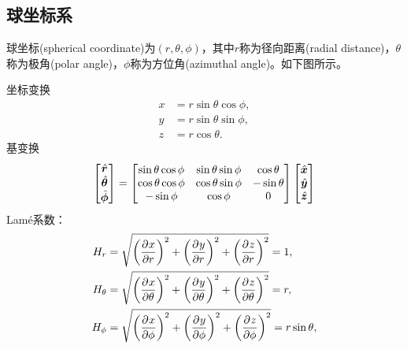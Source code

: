 \subsection{球坐标系}
\label{ssec:spherical coordinate}

球坐标(spherical coordinate)为$(r,\theta,\phi)$，其中$r$称为径向距离(radial distance)，$\theta$称为极角(polar angle)，$\phi$称为方位角(azimuthal angle)。如下图所示。
\begin{notecaptionblock}
    \label{fig:spherical coordinate}
\end{notecaptionblock}
坐标变换
\begin{subequations}
    \begin{align}
        x &= r\sin\theta\cos\phi,\\
        y &= r\sin\theta\sin\phi,\\
        z &= r\cos\theta.
    \end{align}
\end{subequations}
基变换
\begin{equation}
    \begin{bmatrix}
        \mathop{}\!\hat{\bm{r}}\\\mathop{}\!\hat{\bm{\theta}}\\\mathop{}\!\hat{\bm{\phi}}
    \end{bmatrix} =
    \begin{bmatrix}
        \sin\theta\cos\phi&\sin\theta\sin\phi&\cos\theta\\
        \cos\theta\cos\phi&\cos\theta\sin\phi&-\sin\theta\\
        -\sin\phi&\cos\phi&0
    \end{bmatrix}
    \begin{bmatrix}
        \mathop{}\!\hat{\bm{x}}\\\mathop{}\!\hat{\bm{y}}\\\mathop{}\!\hat{\bm{z}}
    \end{bmatrix}
\end{equation}
Lam\'e系数：
\begin{subequations}
    \begin{align}
        H_r &= \sqrt{\biggl(\frac{\partial^{}x}{\partial{r}^{}}\biggr)^2 + \biggl(\frac{\partial^{}y}{\partial{r}^{}}\biggr)^2 + \biggl(\frac{\partial^{}z}{\partial{r}^{}}\biggr)^2} = 1,\\
        H_\theta &= \sqrt{\biggl(\frac{\partial^{}x}{\partial{\theta}^{}}\biggr)^2 + \biggl(\frac{\partial^{}y}{\partial{\theta}^{}}\biggr)^2 + \biggl(\frac{\partial^{}z}{\partial{\theta}^{}}\biggr)^2} = r,\\
        H_\phi &= \sqrt{\biggl(\frac{\partial^{}x}{\partial{\phi}^{}}\biggr)^2 + \biggl(\frac{\partial^{}y}{\partial{\phi}^{}}\biggr)^2 + \biggl(\frac{\partial^{}z}{\partial{\phi}^{}}\biggr)^2} = r\sin\theta,
    \end{align}
\end{subequations}
